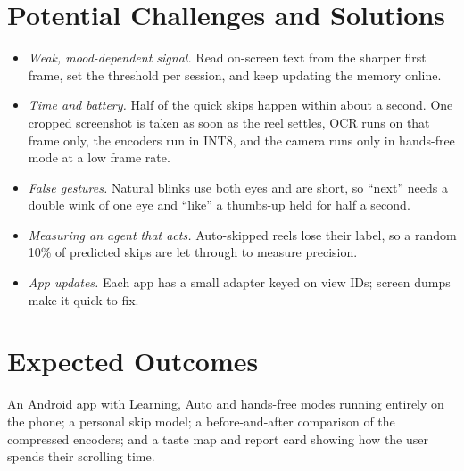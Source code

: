 \documentclass[sigconf,nonacm]{acmart}
\begin{document}
\section{Potential Challenges and Solutions}
\begin{itemize}
  \item \emph{Weak, mood-dependent signal.} Read on-screen text from the sharper first frame,
    set the threshold per session, and keep updating the memory online.
  \item \emph{Time and battery.} Half of the quick skips happen within about a second. One
    cropped screenshot is taken as soon as the reel settles, OCR runs on that frame only, the
    encoders run in INT8, and the camera runs only in hands-free mode at a low frame rate.
  \item \emph{False gestures.} Natural blinks use both eyes and are short, so ``next'' needs a
    double wink of one eye and ``like'' a thumbs-up held for half a second.
  \item \emph{Measuring an agent that acts.} Auto-skipped reels lose their label, so a random
    10\% of predicted skips are let through to measure precision.
  \item \emph{App updates.} Each app has a small adapter keyed on view IDs; screen dumps make
    it quick to fix.
\end{itemize}

\section{Expected Outcomes}
An Android app with Learning, Auto and hands-free modes running entirely on the phone; a
personal skip model; a before-and-after comparison of the compressed encoders; and a taste map
and report card showing how the user spends their scrolling time.



\end{document}
